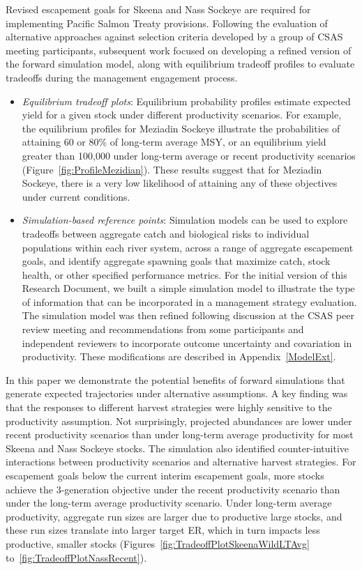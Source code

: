 \documentclass[french,11pt]{book}
\begin{document}
Revised escapement goals for Skeena and Nass Sockeye are required for implementing Pacific Salmon Treaty provisions. Following the evaluation of alternative approaches against selection criteria developed by a group of CSAS meeting participants, subsequent work focused on developing a refined version of the forward simulation model, along with equilibrium tradeoff profiles to evaluate tradeoffs during the management engagement process.
\begin{itemize}

\item
  \emph{Equilibrium tradeoff plots}: Equilibrium probability profiles estimate expected yield for a given stock under different productivity scenarios. For example, the equilibrium profiles for Meziadin Sockeye illustrate the probabilities of attaining 60 or 80\% of long-term average MSY, or an equilibrium yield greater than 100,000 under long-term average or recent productivity scenarios (Figure~\ref{fig:ProfileMezidian}). These results suggest that for Meziadin Sockeye, there is a very low likelihood of attaining any of these objectives under current conditions.
\item
  \emph{Simulation-based reference points}: Simulation models can be used to explore tradeoffs between aggregate catch and biological risks to individual populations within each river system, across a range of aggregate escapement goals, and identify aggregate spawning goals that maximize catch, stock health, or other specified performance metrics. For the initial version of this Research Document, we built a simple simulation model to illustrate the type of information that can be incorporated in a management strategy evaluation. The simulation model was then refined following discussion at the CSAS peer review meeting and recommendations from some participants and independent reviewers to incorporate outcome uncertainty and covariation in productivity. These modifications are described in Appendix~\ref{ModelExt}.
\end{itemize}
In this paper we demonstrate the potential benefits of forward simulations that generate expected trajectories under alternative assumptions. A key finding was that the responses to different harvest strategies were highly sensitive to the productivity assumption. Not surprisingly, projected abundances are lower under recent productivity scenarios than under long-term average productivity for most Skeena and Nass Sockeye stocks. The simulation also identified counter-intuitive interactions between productivity scenarios and alternative harvest strategies. For escapement goals below the current interim escapement goals, more stocks achieve the 3-generation objective under the recent productivity scenario than under the long-term average productivity scenario. Under long-term average productivity, aggregate run sizes are larger due to productive large stocks, and these run sizes translate into larger target ER, which in turn impacts less productive, smaller stocks (Figures~\ref{fig:TradeoffPlotSkeenaWildLTAvg} to~\ref{fig:TradeoffPlotNassRecent}).
\end{document}
